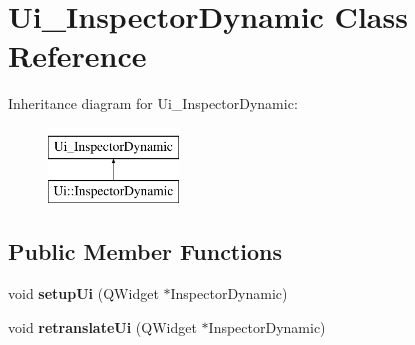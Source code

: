 \hypertarget{class_ui___inspector_dynamic}{}\section{Ui\+\_\+\+Inspector\+Dynamic Class Reference}
\label{class_ui___inspector_dynamic}
Inheritance diagram for Ui\+\_\+\+Inspector\+Dynamic\+:\begin{figure}[H]
\begin{center}
\leavevmode
\includegraphics[height=2.000000cm]{class_ui___inspector_dynamic}
\end{center}
\end{figure}
\subsection*{Public Member Functions}
\begin{DoxyCompactItemize}
\item 
\mbox{\label{class_ui___inspector_dynamic_a692eabefdfc5a78c789c4fe3607c9d42}} 
void {\bfseries setup\+Ui} (Q\+Widget $\ast$Inspector\+Dynamic)
\item 
\mbox{\label{class_ui___inspector_dynamic_a7d7ebd3733e29abcdbfcf388039be915}} 
void {\bfseries retranslate\+Ui} (Q\+Widget $\ast$Inspector\+Dynamic)
\end{DoxyCompactItemize}
